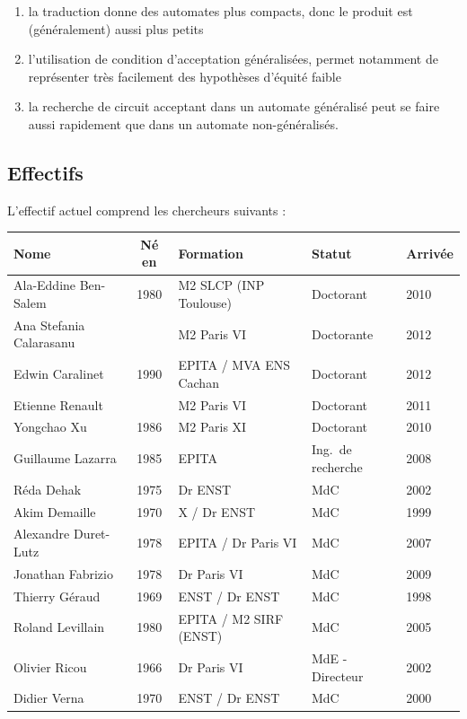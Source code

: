 \documentclass[a4paper,11pt,twoside,final]{article}
\begin{document}
  \begin{enumerate}
    \item la traduction donne des automates plus compacts, donc le produit est
      (généralement) aussi plus petits
    \item l'utilisation de condition d’acceptation généralisées, permet
      notamment de représenter très facilement des hypothèses d'équité faible
    \item la recherche de circuit acceptant dans un automate généralisé peut se
      faire aussi rapidement que dans un automate non-généralisés.
  \end{enumerate}

  \subsection{Effectifs}

  L'effectif actuel comprend les chercheurs suivants :
  \begin{adjustwidth}{-2cm}{-2cm}
    \begin{center}
      \begin{tabular}{| l | c | l | l | l |}
        \hline
        Nome & Né en & Formation & Statut & Arrivée \\
        \hline
        Ala-Eddine Ben-Salem & 1980 & M2 SLCP (INP Toulouse) & Doctorant &
        2010 \\
        Ana Stefania Calarasanu & & M2 Paris VI & Doctorante & 2012 \\
        Edwin Caralinet & 1990 & EPITA / MVA ENS Cachan & Doctorant & 2012 \\
        Etienne Renault & & M2 Paris VI & Doctorant & 2011 \\
        Yongchao Xu & 1986 & M2 Paris XI & Doctorant & 2010 \\
        \hline
        Guillaume Lazarra & 1985 & EPITA & Ing.\ de recherche & 2008 \\
        \hline
        Réda Dehak  & 1975 & Dr ENST & MdC & 2002 \\
        Akim Demaille & 1970 & X / Dr ENST & MdC & 1999 \\
        Alexandre Duret-Lutz & 1978 & EPITA / Dr Paris VI & MdC & 2007 \\
        Jonathan Fabrizio & 1978 & Dr Paris VI & MdC & 2009 \\
        Thierry Géraud & 1969 & ENST / Dr ENST & MdC & 1998 \\
        Roland Levillain & 1980 & EPITA / M2 SIRF (ENST) & MdC & 2005 \\
        Olivier Ricou & 1966 & Dr Paris VI & MdE - Directeur & 2002 \\
        Didier Verna & 1970 & ENST / Dr ENST & MdC & 2000 \\
        \hline
      \end{tabular}
    \end{center}
  \end{adjustwidth}
\end{document}

